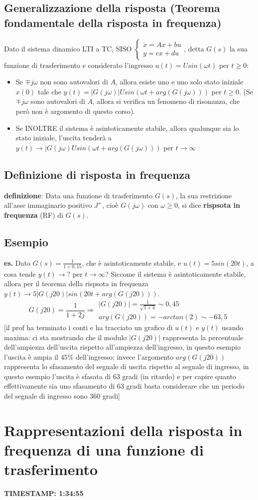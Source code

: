 \subsection{Generalizzazione della risposta (Teorema fondamentale della risposta in frequenza)}
Dato il sistema dinamico LTI a TC, SISO $\begin{cases}
    \dot{x} = Ax +bu\\ 
    y = cx +du
\end{cases}$, detta $G(s)$ la sua funzione di trasferimento e considerato l'ingresso $u(t) = U sin(\omega t)$ per $t\geq 0$:
\begin{itemize}
    \item Se $\mp j \omega$ non sono autovalori di $A$, allora esiste uno e uno solo stato iniziale $x(0)$ tale che $y(t) = |G(j \omega)| U sin(\omega t + arg(G(j \omega)))$ per $t\geq 0$. (Se $\mp j \omega$ sono autovalori di $A$, allora si verifica un fenomeno di risonanza, che però non è argomento di questo corso).
    \item Se INOLTRE il sistema è asintoticamente stabile, allora qualunque sia lo stato iniziale, l'uscita  tenderà a $y(t) \rightarrow |G(j \omega) U sin( \omega t + arg(G(j \omega)))$ per $t \rightarrow  \infty$
\end{itemize}
\subsection{Definizione di risposta in frequenza}
\textbf{definizione}:  Data una funzione di trasferimento $G(s)$, la sua restrizione all'asse immaginario positivo $J^+$, cioè $G(j \omega)$ con $\omega \geq 0$, si dice \textbf{rispsota in frequenza} (RF) di $G(s)$.
\subsection{Esempio}
\textbf{es.} Dato $G(s) = \frac{1}{1+0,15}$, che è asintoticamente stabile, e $u(t) = 5 sin(20 t)$, a cosa tende $y(t) \rightarrow ?$ per $t \rightarrow \infty$?\newline
\newline
Siccome il sistema è asintoticamente stabile, allora per il teorema della rispsota in frequenza $y(t) \rightarrow 5 |G(j 20)| sin(20 t + arg(G(j 20)))$.
\[
    G(j 20) = \frac{1}{1 + 2j} \Rightarrow \begin{matrix}
        |G(j 20)| = \frac{1}{\sqrt{1+4}} \sim  0,45\\
        arg(G(j 20)) = -arctan(2) \sim  -63,5
    \end{matrix}
\]
[il prof ha terminato i conti e ha tracciato un grafico di $u(t)$ e $y(t)$ usando maxima: ci sta mostrando che il modulo $|G(j 20)|$ rappresenta la percentuale dell'ampiezza dell'uscita rispetto all'ampiezza dell'ingresso, in questo esempio l'uscita è ampia il $45\%$ dell'ingresso; invece l'argomento $arg(G(j 20))$ rappresenta lo sfasamento del segnale di uscita rispetto al segnale di ingresso, in questo esempio l'uscita è sfasata di $63$ gradi (in ritardo) e per capire quanto effettivamente sia uno sfasamento di $63$ gradi basta considerare che un periodo del segnale di ingresso sono $360$ gradi]
\newpage
\section{Rappresentazioni della risposta in frequenza di una funzione di trasferimento}
\textbf{TIMESTAMP: 1:34:55}